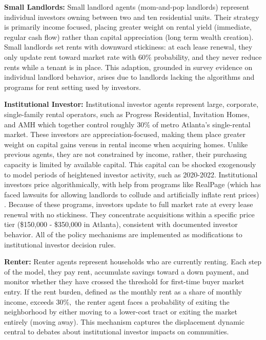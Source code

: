 \documentclass[twocolumn,showpacs,%
  nofootinbib,aps,superscriptaddress,%
  eqsecnum,prd,notitlepage,showkeys,10pt]{revtex4-1}
\begin{document}
\textbf{Small Landlords:} Small landlord agents (mom-and-pop landlords) represent individual investors owning between two and ten residential units. Their strategy is primarily income focused, placing greater weight on rental yield (immediate, regular cash flow) rather than capital appreciation (long term wealth creation). Small landlords set rents with downward stickiness: at each lease renewal, they only update rent toward market rate with $60\%$ probability, and they never reduce rents while a tenant is in place. This adaption, grounded in survey evidence on individual landlord behavior, arises due to landlords lacking the algorithms and programs for rent setting used by investors. \newline

\textbf{Institutional Investor: } Institutional investor agents represent large, corporate, single-family rental operators, such as Progress Residential, Invitation Homes, and AMH which together control roughly $30\%$ of metro Atlanta's single-rental market. These investors are appreciation-focused, making them place greater weight on capital gains versus in rental income when acquiring homes. Unlike previous agents, they are not constrained by income, rather, their purchasing capacity is limited by available capital. This capital can be shocked exogenously to model periods of heightened investor activity, such as 2020-2022. Institutional investors price algorithmically, with help from programs like RealPage (which has faced lawsuits for allowing landlords to collude and artificially inflate rent prices) \cite{dojrealpage2024}. Because of these programs, investors update to full market rate at every lease renewal with no stickiness. They concentrate acquisitions within a specific price tier (\$150,000 - \$350,000 in Atlanta), consistent with documented investor behavior. All of the policy mechanisms are implemented as modifications to institutional investor decision rules.\newline

\textbf{Renter: } Renter agents represent households who are currently renting. Each step of the model, they pay rent, accumulate savings toward a down payment, and monitor whether they have crossed the threshold for first-time buyer market entry. If the rent burden, defined as the monthly rent as a share of monthly income, exceeds $30\%,$ \cite{hudburden} the renter agent faces a probability of exiting the neighborhood by either moving to a lower-cost tract or exiting the market entirely (moving away). This mechanism captures the displacement dynamic central to debates about institutional investor impacts on communities.\newline
\end{document}
